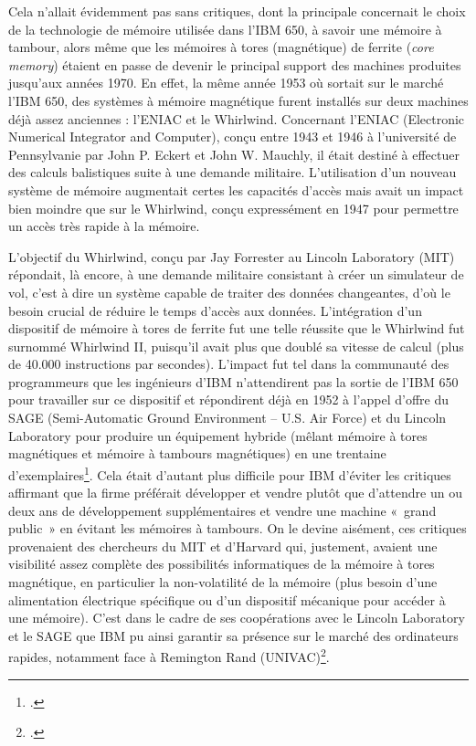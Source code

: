 \documentclass{FramateX}
\begin{document}
\begin{refsection}
Cela n'allait évidemment pas sans critiques, dont la
principale concernait le choix de la technologie de mémoire utilisée
dans l'IBM 650, à savoir une mémoire à tambour, alors
même que les mémoires à tores (magnétique) de ferrite (\textit{core
memory}) étaient en passe de devenir le principal support des machines
produites jusqu'aux années 1970. En effet, la même
année 1953 où sortait sur le marché l'IBM 650, des
systèmes à mémoire magnétique furent installés sur deux machines déjà
assez anciennes : l'ENIAC et le Whirlwind. Concernant
l'ENIAC (Electronic Numerical Integrator and
Computer), conçu entre 1943 et 1946 à l'université de
Pennsylvanie par John P. Eckert et John W. Mauchly, il était destiné à
effectuer des calculs balistiques suite à une demande militaire.
L'utilisation d'un nouveau système de
mémoire augmentait certes les capacités d'accès mais
avait un impact bien moindre que sur le Whirlwind, conçu expressément
en 1947 pour permettre un accès très rapide à la mémoire.

L'objectif du Whirlwind, conçu par Jay Forrester au
Lincoln Laboratory (MIT) répondait, là encore, à une demande militaire
consistant à créer un simulateur de vol, c'est à dire
un système capable de traiter des données changeantes,
d'où le besoin crucial de réduire le temps
d'accès aux données. L'intégration
d'un dispositif de mémoire à tores de ferrite fut une
telle réussite que le Whirlwind fut surnommé Whirlwind II,
puisqu'il avait plus que doublé sa vitesse de calcul
(plus de 40.000 instructions par secondes). L'impact
fut tel dans la communauté des programmeurs que les ingénieurs
d'IBM n'attendirent pas la sortie de
l'IBM 650 pour travailler sur ce dispositif et
répondirent déjà en 1952 à l'appel
d'offre du SAGE (Semi-Automatic Ground Environment
-- U.S. Air Force) et du Lincoln Laboratory pour produire un
équipement hybride (mêlant mémoire à tores magnétiques et mémoire à
tambours magnétiques) en une trentaine
d'exemplaires\footnote{\cite{astrahanhistory1983}.}. Cela était
d'autant plus difficile pour IBM
d'éviter les critiques affirmant que la firme
préférait développer et vendre plutôt que d'attendre
un ou deux ans de développement supplémentaires et vendre une machine
«~grand public~» en évitant les mémoires à tambours. On le devine
aisément, ces critiques provenaient des chercheurs du MIT et
d'Harvard qui, justement, avaient une visibilité assez
complète des possibilités informatiques de la mémoire à tores
magnétique, en particulier la non-volatilité de la mémoire (plus besoin
d'une alimentation électrique spécifique ou
d'un dispositif mécanique pour accéder à une mémoire).
C'est dans le cadre de ses coopérations avec le
Lincoln Laboratory et le SAGE que IBM pu ainsi garantir sa présence sur
le marché des ordinateurs rapides, notamment face à Remington Rand
(UNIVAC)\footnote{\cite{pughmemories1984}.}.


\end{refsection}
\end{document}
